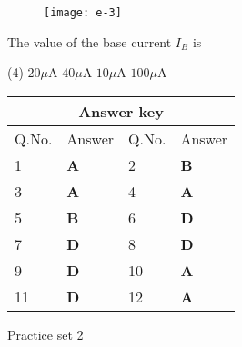 \begin{enumerate}
	\begin{figure}[H]
		\centering
		\texttt{[image: e-3]}
	\end{figure}
	The value of the base current $I_{B}$ is
	{	}
	\begin{tasks}(4)
		\task[\textbf{A.}] $20 \mu \mathrm{A}$
		\task[\textbf{B.}]  $40 \mu \mathrm{A}$
		\task[\textbf{C.}] $10 \mu \mathrm{A}$
		\task[\textbf{D.}] $100 \mu \mathrm{A}$
	\end{tasks}
\end{enumerate}
\setlength\arrayrulewidth{1pt}
\begin{table}[H]
	\centering
	\begin{tabular}{|p{1.5cm}|p{1.5cm}||p{1.5cm}|p{1.5cm}|}
		\hline
		\multicolumn{4}{|c|}{\textbf{Answer key}}\\\hline\hline
		\rowcolor{ocrel}Q.No.&Answer&Q.No.&Answer\\\hline
		1&\textbf{A} &2&\textbf{B}\\\hline 
		3&\textbf{A} &4&\textbf{A} \\\hline
		5&\textbf{B} &6&\textbf{D} \\\hline
		7&\textbf{D}&8&\textbf{D}\\\hline
		9&\textbf{D}&10&\textbf{A}\\\hline
		11&\textbf{D} &12&\textbf{A}\\\hline
		
	\end{tabular}
\end{table}
\newpage
\begin{abox}
	Practice set 2 
	\end{abox}
